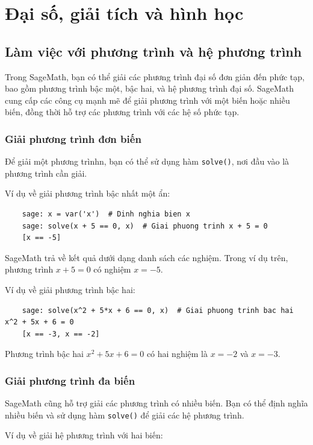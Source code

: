 \section{Đại số, giải tích và hình học}
\subsection{Làm việc với phương trình và hệ phương trình}

Trong SageMath, bạn có thể giải các phương trình đại số đơn giản đến phức tạp, bao gồm phương trình bậc một, bậc hai, và hệ phương trình đại số. SageMath cung cấp các công cụ mạnh mẽ để giải phương trình với một biến hoặc nhiều biến, đồng thời hỗ trợ các phương trình với các hệ số phức tạp.

\subsubsection{Giải phương trình đơn biến}

Để giải một phương trìnhn, bạn có thể sử dụng hàm \texttt{solve()}, nơi đầu vào là phương trình cần giải.

Ví dụ về giải phương trình bậc nhất một ẩn:

\begin{lstlisting}
	sage: x = var('x')  # Dinh nghia bien x
	sage: solve(x + 5 == 0, x)  # Giai phuong trinh x + 5 = 0
	[x == -5]
\end{lstlisting}

SageMath trả về kết quả dưới dạng danh sách các nghiệm. Trong ví dụ trên, phương trình \(x + 5 = 0\) có nghiệm \(x = -5\).

Ví dụ về giải phương trình bậc hai:

\begin{lstlisting}
	sage: solve(x^2 + 5*x + 6 == 0, x)  # Giai phuong trinh bac hai x^2 + 5x + 6 = 0
	[x == -3, x == -2]
\end{lstlisting}

Phương trình bậc hai \(x^2 + 5x + 6 = 0\) có hai nghiệm là \(x = -2\) và \(x = -3\).

\subsubsection{Giải phương trình đa biến}

SageMath cũng hỗ trợ giải các phương trình có nhiều biến. Bạn có thể định nghĩa nhiều biến và sử dụng hàm \texttt{solve()} để giải các hệ phương trình.

Ví dụ về giải hệ phương trình với hai biến:

